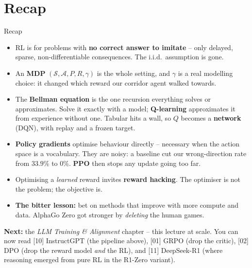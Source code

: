 \documentclass[aspectratio=169]{beamer}
\begin{document}
\section*{Recap}
\begin{frame}{Recap}
  \scriptsize
  \begin{itemize}\itemsep2pt
    \item RL is for problems with \textbf{no correct answer to imitate} -- only delayed, sparse,
          non-differentiable consequences. The i.i.d.\ assumption is gone.
    \item An \textbf{MDP} $(\mathcal{S}, \mathcal{A}, P, R, \gamma)$ is the whole setting, and
          $\gamma$ is a real modelling choice: it changed which reward our corridor agent walked
          towards.
    \item The \textbf{Bellman equation} is the one recursion everything solves or approximates.
          Solve it exactly with a model; \textbf{Q-learning} approximates it from experience
          without one. Tabular hits a wall, so $Q$ becomes a \textbf{network} (DQN), with replay
          and a frozen target.
    \item \textbf{Policy gradients} optimise behaviour directly -- necessary when the action
          space is a vocabulary. They are noisy: a baseline cut our wrong-direction rate from
          $33.9\%$ to $0\%$. \textbf{PPO} then stops any update going too far.
    \item Optimising a \emph{learned} reward invites \textbf{reward hacking}. The optimiser is
          not the problem; the objective is.
    \item \textbf{The bitter lesson:} bet on methods that improve with more compute and data.
          AlphaGo Zero got stronger by \emph{deleting} the human games.
  \end{itemize}

  \vskip 4pt
  \begin{tcolorbox}[colback=paramgreen!8, colframe=paramgreen, boxrule=0.8pt, arc=2pt]
    \footnotesize
    \textbf{Next:} the \emph{LLM Training \& Alignment} chapter -- this lecture at scale. You can
    now read [10] InstructGPT (the pipeline above), [01] GRPO (drop the critic), [02] DPO (drop
    the reward model \emph{and} the RL), and [11] DeepSeek-R1 (where reasoning emerged from
    pure RL in the R1-Zero variant).
  \end{tcolorbox}
\end{frame}
\end{document}
